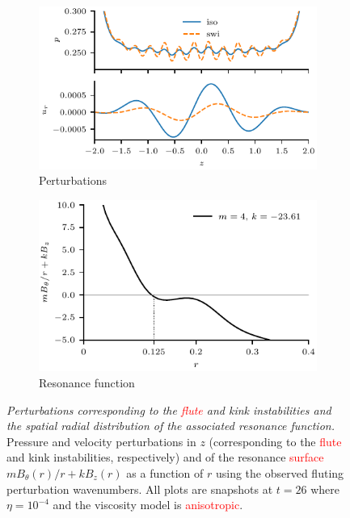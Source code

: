 \documentclass[12pt]{article}
\newcommand{\rs}[2]{\textcolor{red}{#2}}
\newcommand{\mycaption}[2]{\caption[#1]{\emph{#1} #2}}
\begin{document}
\begin{figure}[t]
  \centering
    \begin{subfigure}{0.49\textwidth}
      \includegraphics[width=\linewidth]{perturbations_4.pdf}
      \caption{Perturbations}
      \label{fig:pressure_pert_4}
    \end{subfigure}
    \hfill
    \begin{subfigure}{0.49\textwidth}
      \includegraphics[width=\linewidth]{resonant_surface_4.pdf}
      \caption{Resonance function}
      \label{fig:resonant_surface_4}
    \end{subfigure}
\mycaption{Perturbations corresponding to the \rs{fluting}{flute} and
  kink instabilities and the spatial radial distribution of the
  associated resonance function.}{Pressure and velocity perturbations
  in $z$ (corresponding to the \rs{fluting}{flute} and kink
  instabilities, respectively) and of the resonance
  \rs{function}{surface} $m B_{\theta}(r)/r + kB_z(r)$ as a function
  of $r$ using the observed fluting perturbation wavenumbers. All
  plots are \rs{from}{} snapshots at $t=26$ where $\eta=10^{-4}$ and
  the viscosity model is \rs{switching}{anisotropic}.} 
\label{fig:k_and_resonance}%
\end{figure}
\end{document}
